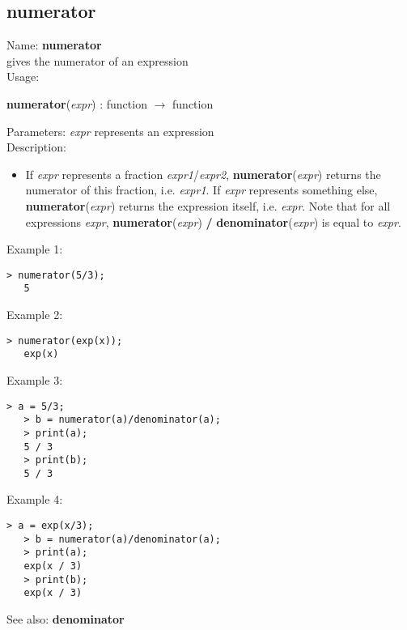 \subsection{ numerator }
\noindent Name: \textbf{numerator}\\
gives the numerator of an expression\\

\noindent Usage: 
\begin{center}
\textbf{numerator}(\emph{expr}) : \textsf{function} $\rightarrow$ \textsf{function}\\
\end{center}
Parameters: 
\emph{expr} represents an expression\\

\noindent Description: \begin{itemize}

\item If \emph{expr} represents a fraction \emph{expr1}/\emph{expr2}, \textbf{numerator}(\emph{expr})
   returns the numerator of this fraction, i.e. \emph{expr1}.
   If \emph{expr} represents something else, \textbf{numerator}(\emph{expr}) 
   returns the expression itself, i.e. \emph{expr}.
   Note that for all expressions \emph{expr}, \textbf{numerator}(\emph{expr}) \textbf{/} \textbf{denominator}(\emph{expr})
   is equal to \emph{expr}.
\end{itemize}
\noindent Example 1: 
\begin{center}\begin{minipage}{14.8cm}\begin{Verbatim}[frame=single]
   > numerator(5/3);
   5
\end{Verbatim}
\end{minipage}\end{center}
\noindent Example 2: 
\begin{center}\begin{minipage}{14.8cm}\begin{Verbatim}[frame=single]
   > numerator(exp(x));
   exp(x)
\end{Verbatim}
\end{minipage}\end{center}
\noindent Example 3: 
\begin{center}\begin{minipage}{14.8cm}\begin{Verbatim}[frame=single]
   > a = 5/3;
   > b = numerator(a)/denominator(a);
   > print(a);
   5 / 3
   > print(b);
   5 / 3
\end{Verbatim}
\end{minipage}\end{center}
\noindent Example 4: 
\begin{center}\begin{minipage}{14.8cm}\begin{Verbatim}[frame=single]
   > a = exp(x/3);
   > b = numerator(a)/denominator(a);
   > print(a);
   exp(x / 3)
   > print(b);
   exp(x / 3)
\end{Verbatim}
\end{minipage}\end{center}
See also: \textbf{denominator}
